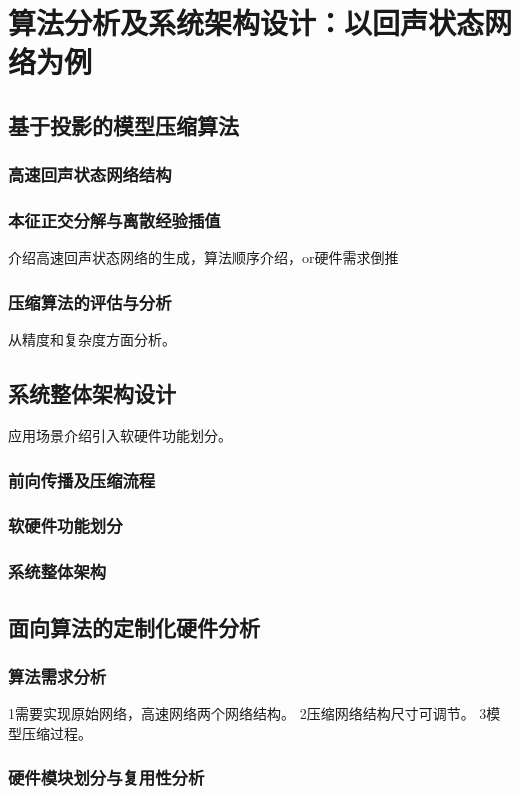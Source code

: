 
\chapter{算法分析及系统架构设计：以回声状态网络为例}

\section{基于投影的模型压缩算法}
\subsection{高速回声状态网络结构}
\subsection{本征正交分解与离散经验插值}
介绍高速回声状态网络的生成，算法顺序介绍，or硬件需求倒推
\subsection{压缩算法的评估与分析}
从精度和复杂度方面分析。

\section{系统整体架构设计}
应用场景介绍引入软硬件功能划分。
\subsection{前向传播及压缩流程}
\subsection{软硬件功能划分}
\subsection{系统整体架构}

\section{面向算法的定制化硬件分析}
\subsection{算法需求分析}
1需要实现原始网络，高速网络两个网络结构。
2压缩网络结构尺寸可调节。
3模型压缩过程。
\subsection{硬件模块划分与复用性分析}
